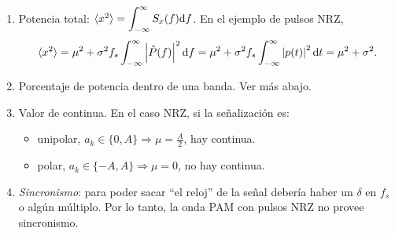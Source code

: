 \begin{enumerate}
    \item Potencia total: $\langle x^2\rangle = \displaystyle\int_{-\infty}^{\infty} S_x(f)\mathrm{d} f $.
    En el ejemplo de pulsos NRZ,
    \[
     \langle x^2\rangle = \mu^2 +\sigma^2 f_s \displaystyle\int_{-\infty}^{\infty}
    \left|\hat{P}(f)\right|^2\mathrm{d} f = \mu^2 +\sigma^2 f_s \displaystyle\int_{-\infty}^{\infty} \left|p(t)\right|^2\mathrm{d}
    t = \mu^2 + \sigma^2.\]
    \item Porcentaje de potencia dentro de una banda.  Ver más abajo.
     \item Valor de continua. En el caso NRZ, si la señalización es:
    \begin{itemize}
        \item unipolar, $a_k\in \{0,A\}\Rightarrow \mu=\frac{A}{2}$, hay continua.
        \item polar, $a_k\in \{-A,A\}\Rightarrow \mu = 0$, no hay continua.
    \end{itemize}
    \item \emph{Sincronismo}: para poder sacar ``el reloj'' de la señal debería haber un $\delta$ en $f_s$ o algún múltiplo. Por lo tanto, la onda PAM con pulsos NRZ
     no provee sincronismo.
\end{enumerate}
\newpage

